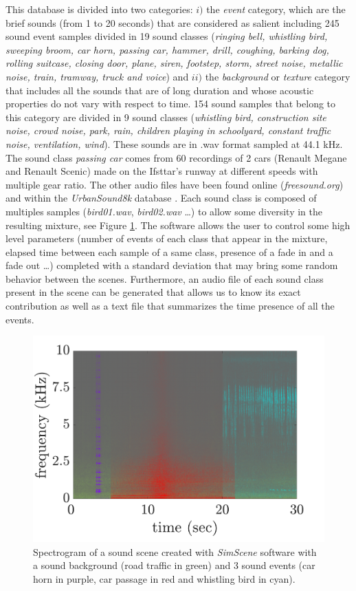 \documentclass[twocolumn]{svjour3}          %
\begin{document}
This database is divided into two categories: $i)$ the \textit{event} category, which are the brief sounds (from 1 to 20 seconds) that are considered as salient including 245 sound event samples divided in 19 sound classes (\textit{ringing bell, whistling bird, sweeping broom, car horn, passing car, hammer, drill, coughing, barking dog, rolling suitcase, closing door, plane, siren, footstep, storm, street noise, metallic noise, train, tramway, truck and voice}) and $ii)$ the \textit{background} or \textit{texture} category that includes all the sounds that are of long duration and whose acoustic properties do not vary with respect to time. 154 sound samples that belong to this category are divided in 9 sound classes (\textit{whistling bird, construction site noise, crowd noise, park, rain, children playing in schoolyard, constant traffic noise, ventilation, wind}). These sounds are in .wav format sampled at 44.1 kHz. The sound class \textit{passing car} comes from 60 recordings of 2 cars (Renault Megane and Renault Scenic) made on the Ifsttar's runway at different speeds with multiple gear ratio. The other audio files have been found online (\textit{freesound.org}) and within the \textit{UrbanSound8k} database \cite{salamon_dataset_nodate}. Each sound class is composed of multiples samples (\textit{bird01.wav}, \textit{bird02.wav} \dots) to allow some diversity in the resulting mixture, see Figure \ref{fig:example_simScene}. The software allows the user to control some high level parameters (number of events of each class that appear in the mixture, elapsed time between each sample of a same class, presence of a fade in and a fade out \dots) completed with a standard deviation that may bring some random behavior between the scenes. Furthermore, an audio file of each sound class present in the scene can be generated that allows us to know its exact contribution as well as a text file that summarizes the time presence of all the events.\\


\begin{figure}[t]
    \centering
       \includegraphics[width=.85\linewidth]{./figures/exampleSimScene}
    \caption{Spectrogram of a sound scene created with \textit{SimScene} software with a sound background (road traffic in green) and 3 sound events (car horn in purple, car passage in red and whistling bird in cyan).}
    \label{fig:example_simScene}
\end{figure}
\end{document}
